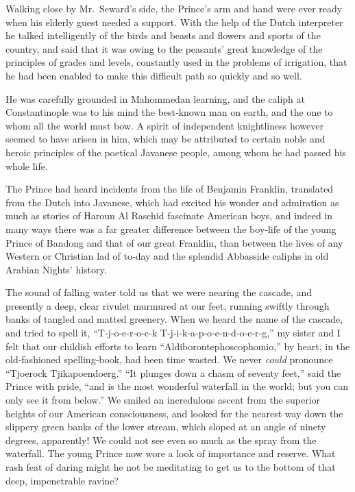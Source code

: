 \documentclass[12pt]{book}
\begin{document}
Walking close by Mr.~Seward’s side, the Prince’s arm and hand were ever
ready when his elderly guest needed a support. With the help of the Dutch
interpreter he talked intelligently of the birds and beasts and flowers and sports
of the country, and said that it was owing to the peasants’ great knowledge of
the principles of grades and levels, constantly used in the problems of irrigation,
that he had been enabled to make this difficult path so quickly and so well.

He was carefully grounded in Mahommedan learning, and the caliph at Constantinople was to his mind the best‐known man on earth, and the one to whom
all the world must bow. A spirit of independent knightliness however seemed to
have arisen in him, which may be attributed to certain noble and heroic principles
of the poetical Javanese people, among whom he had passed his whole life.

The Prince had heard incidents from the life of Benjamin Franklin, translated
from the Dutch into Javanese, which had excited his wonder and admiration as
much as stories of Haroun Al Raschid fascinate American boys, and indeed in
many ways there was a far greater difference between the boy‐life of the young
Prince of Bandong and that of our great Franklin, than between the lives of any
Western or Christian lad of to‐day and the splendid Abbasside caliphs in old
Arabian Nights’ history.

The sound of falling water told us that we were nearing the cascade, and
presently a deep, clear rivulet murmured at our feet, running swiftly through
banks of tangled and matted greenery. When we heard the name of the cascade,
and tried to spell it, “T‐j‐o‐e‐r‐o‐c‐k T‐j‐i‐k‐a‐p‐o‐e‐n‐d‐o‐e‐r‐g,” my sister and I
felt that our childish efforts to learn “Aldiborontephoscophomio,” by heart, in the
old‐fashioned spelling‐book, had been time wasted. We never \emph{could} pronounce
“Tjoerock Tjikapoendoerg.” “It plunges down a chasm of seventy feet,” said the
Prince with pride, “and is the most wonderful waterfall in the world; but you
can only see it from below.” We smiled an incredulous ascent from the superior
heights of our American consciousness, and looked for the nearest way down
the slippery green banks of the lower stream, which sloped at an angle of ninety
degrees, apparently! We could not see even so much as the spray from the
waterfall. The young Prince now wore a look of importance and reserve. What
rash feat of daring might he not be meditating to get us to the bottom of that
deep, impenetrable ravine?
\end{document}
